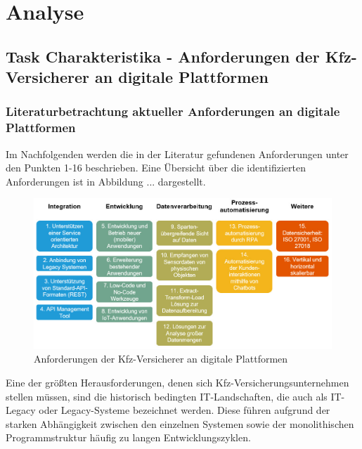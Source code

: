\chapter{Analyse}
\section{Task Charakteristika - Anforderungen der Kfz-Versicherer an digitale Plattformen}

\subsection{Literaturbetrachtung aktueller Anforderungen an digitale Plattformen}


Im Nachfolgenden werden die in der Literatur gefundenen Anforderungen unter den Punkten 1-16 beschrieben. Eine Übersicht über die identifizierten Anforderungen ist in Abbildung ... dargestellt.

\begin{figure}[h]
    \centering
    \includegraphics[width=1\textwidth]{img/PP_Anforderungen.jpg}
    \caption[Anforderungen der Kfz-Versicherer an digitale Plattformen]{Anforderungen der Kfz-Versicherer an digitale Plattformen\autocite{PPAnf}}
    \label{fig:PPAnf}
\end{figure}

Eine der größten Herausforderungen, denen sich Kfz-Versicherungsunternehmen stellen müssen, sind die historisch bedingten IT-Landschaften, die auch als IT-Legacy oder Legacy-Systeme bezeichnet werden. Diese führen aufgrund der starken Abhängigkeit zwischen den einzelnen Systemen sowie der monolithischen Programmstruktur häufig zu langen Entwicklungszyklen. \autocite[Vgl.][S. 10-12]{GUNTER2020}

